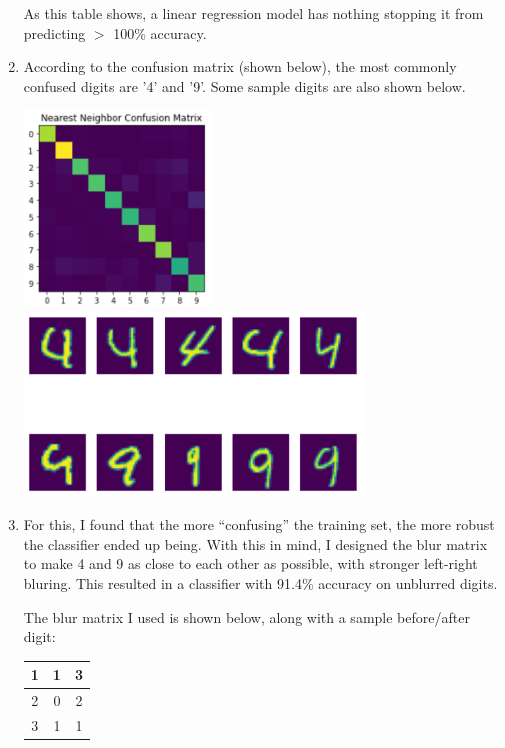 \documentclass{article}
\begin{document}
\begin{enumerate}[start=1]
    As this table shows, a linear regression model has nothing stopping it from predicting $>$ 100\% accuracy.

    
\newpage

\item %
    According to the confusion matrix (shown below), the most commonly confused digits are '4' and '9'. Some sample digits are also shown below.
    
    \begin{center}
    \includegraphics[width=5cm]{5.1.png}
    \includegraphics[width=9cm]{5.2.png}
    \end{center}

\item %
    For this, I found that the more ``confusing'' the training set, the more robust the classifier ended up being. With this in mind, I designed the blur matrix to make 4 and 9 as close to each other as possible, with stronger left-right bluring. This resulted in a classifier with 91.4\% accuracy on unblurred digits.
    
    The blur matrix I used is shown below, along with a sample before/after digit:
    
    \begin{tabular}{| c | c | c |}
    \hline
    1 & 1 & 3 \\
    \hline
    2 & 0 & 2 \\
    \hline
    3 & 1 & 1 \\
    \hline
    \end{tabular}
    

\end{enumerate}
\end{document}
